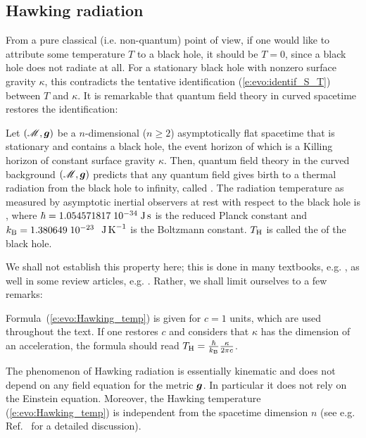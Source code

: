 \subsection{Hawking radiation}

From a pure classical (i.e. non-quantum) point of view, if one would like to attribute some
temperature $T$ to a black hole, it should be $T=0$, since a black hole does not radiate at all.
For a stationary black hole with nonzero surface gravity $\kappa$, this contradicts the tentative identification (\ref{e:evo:identif_S_T}) between $T$ and $\kappa$.
It is remarkable that quantum field theory in curved spacetime
restores the identification:

\begin{prop}
Let $(\mathscr{M},\bm{g})$ be a $n$-dimensional ($n\geq 2$) asymptotically flat
spacetime that is stationary and contains a black hole, the event horizon
of which is a Killing horizon of constant surface gravity $\kappa$.
Then, quantum field theory in the curved background $(\mathscr{M},\bm{g})$
predicts that any quantum field gives birth to a thermal radiation
from the black hole to infinity, called
. The radiation temperature
as measured by asymptotic inertial observers at rest with respect to the black hole
is
\be \label{e:evo:Hawking_temp}
     ,
\ee
where $\hbar = 1.054571817\; 10^{-34} {\rm\; J\, s}$ is the reduced Planck constant and
$k_{\rm B} = 1.380649\; 10^{-23}$ ${\rm\;  J\, K}^{-1}$ is the Boltzmann constant. $T_{\rm H}$ is called the
 of the black hole.
\end{prop}

We shall not establish this property here; this is done in many textbooks,
e.g. \cite{Wald84,Wald94,FroloN98,Carro04,FabbrN05}, as well in some review
articles, e.g. \cite{BroutMPS95,Damou04}. Rather, we shall limit
ourselves to a few remarks:

\begin{remark}\label{r:evo:Hawking_temp_units}
Formula~(\ref{e:evo:Hawking_temp}) is given for $c=1$
units, which are used throughout the text. If one restores $c$ and considers
that $\kappa$ has the dimension of an acceleration, the formula should read
$T_{\rm H} = \frac{\hbar}{k_{\rm B}} \frac{\kappa}{2\pi c}$.
\end{remark}

\begin{remark}
The phenomenon of Hawking radiation is essentially kinematic and does not depend on any field equation for the
metric $\bm{g}$. In particular it does not rely on the Einstein equation.
Moreover, the Hawking temperature (\ref{e:evo:Hawking_temp}) is independent from the spacetime dimension
$n$ (see e.g. Ref.~\cite{KantiW15} for a detailed discussion).
\end{remark}

